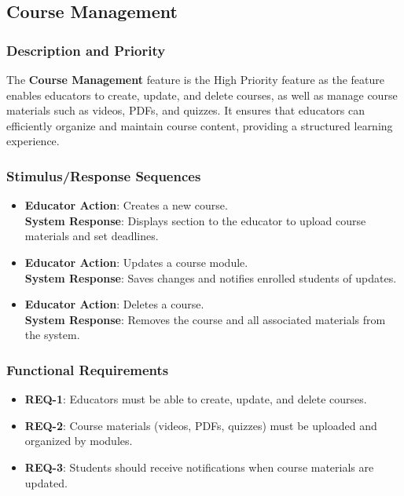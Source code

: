 \documentclass[a4paper, 11pt]{scrreprt}
\begin{document}
\subsection{Course Management}
\subsubsection{Description and Priority}
The \textbf{Course Management} feature is the High Priority feature as the feature enables educators to create, update, and delete courses, as well as manage course materials such as videos, PDFs, and quizzes. It ensures that educators can efficiently organize and maintain course content, providing a structured learning experience.

\subsubsection{Stimulus/Response Sequences}
\begin{itemize}
    \item \textbf{Educator Action}: Creates a new course. \\
          \textbf{System Response}: Displays section to the educator to upload course materials and set deadlines.
    \item \textbf{Educator Action}: Updates a course module. \\
          \textbf{System Response}: Saves changes and notifies enrolled students of updates.
    \item \textbf{Educator Action}: Deletes a course. \\
          \textbf{System Response}: Removes the course and all associated materials from the system.
\end{itemize}

\subsubsection{Functional Requirements}
\begin{itemize}
    \item \textbf{REQ-1}: Educators must be able to create, update, and delete courses.
    \item \textbf{REQ-2}: Course materials (videos, PDFs, quizzes) must be uploaded and organized by modules.
    \item \textbf{REQ-3}: Students should receive notifications when course materials are updated.
\end{itemize}
\end{document}
